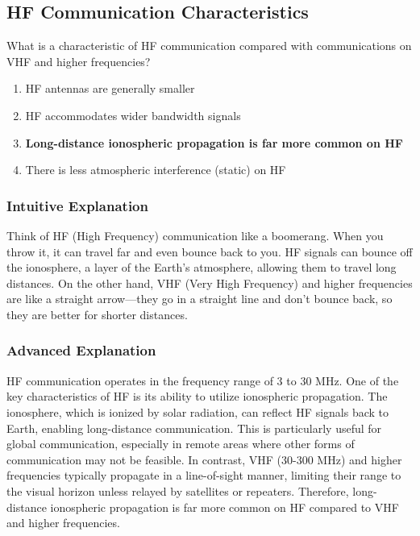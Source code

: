 \subsection{HF Communication Characteristics}
\label{T3C02}

\begin{tcolorbox}[colback=gray!10!white,colframe=black!75!black,title=T3C02]
What is a characteristic of HF communication compared with communications on VHF and higher frequencies?
\begin{enumerate}[noitemsep]
    \item HF antennas are generally smaller
    \item HF accommodates wider bandwidth signals
    \item \textbf{Long-distance ionospheric propagation is far more common on HF}
    \item There is less atmospheric interference (static) on HF
\end{enumerate}
\end{tcolorbox}

\subsubsection*{Intuitive Explanation}
Think of HF (High Frequency) communication like a boomerang. When you throw it, it can travel far and even bounce back to you. HF signals can bounce off the ionosphere, a layer of the Earth's atmosphere, allowing them to travel long distances. On the other hand, VHF (Very High Frequency) and higher frequencies are like a straight arrow—they go in a straight line and don't bounce back, so they are better for shorter distances.

\subsubsection*{Advanced Explanation}
HF communication operates in the frequency range of 3 to 30 MHz. One of the key characteristics of HF is its ability to utilize ionospheric propagation. The ionosphere, which is ionized by solar radiation, can reflect HF signals back to Earth, enabling long-distance communication. This is particularly useful for global communication, especially in remote areas where other forms of communication may not be feasible. In contrast, VHF (30-300 MHz) and higher frequencies typically propagate in a line-of-sight manner, limiting their range to the visual horizon unless relayed by satellites or repeaters. Therefore, long-distance ionospheric propagation is far more common on HF compared to VHF and higher frequencies.